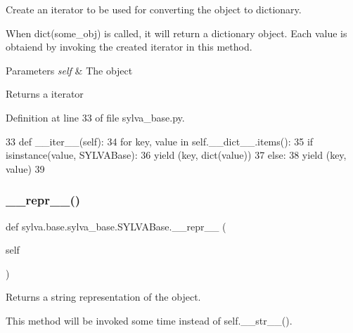 Create an iterator to be used for converting the object to dictionary. 

When dict(some\+\_\+obj) is called, it will return a dictionary object. Each value is obtaiend by invoking the created iterator in this method.


\begin{DoxyParams}{Parameters}
{\em self} & The object\\
\hline
\end{DoxyParams}
\begin{DoxyReturn}{Returns}
a iterator 
\end{DoxyReturn}


Definition at line 33 of file sylva\+\_\+base.\+py.


\begin{DoxyCode}
33     \textcolor{keyword}{def }\_\_iter\_\_(self):
34         \textcolor{keywordflow}{for} key, value \textcolor{keywordflow}{in} self.\_\_dict\_\_.items():
35             \textcolor{keywordflow}{if} isinstance(value, SYLVABase):
36                 \textcolor{keywordflow}{yield} (key, dict(value))
37             \textcolor{keywordflow}{else}:
38                 \textcolor{keywordflow}{yield} (key, value)
39 
\end{DoxyCode}
\mbox{\label{classsylva_1_1base_1_1sylva__base_1_1_s_y_l_v_a_base_a5bd08c41ab09c380433d0de82fb98860}} 
\subsubsection{\texorpdfstring{\+\_\+\+\_\+repr\+\_\+\+\_\+()}{\_\_repr\_\_()}}
{\footnotesize\ttfamily def sylva.\+base.\+sylva\+\_\+base.\+S\+Y\+L\+V\+A\+Base.\+\_\+\+\_\+repr\+\_\+\+\_\+ (\begin{DoxyParamCaption}\item[{}]{self }\end{DoxyParamCaption})\hspace{0.3cm}{\ttfamily [inherited]}}



Returns a string representation of the object. 

This method will be invoked some time instead of self.\+\_\+\+\_\+str\+\_\+\+\_\+().


